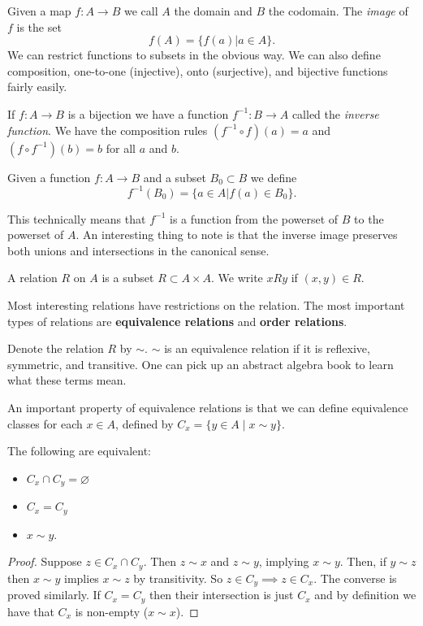Given a map $f: A \to B$ we call $A$ the domain and $B$ the codomain. The \textit{image} of $f$ is the set 
\[f(A) = \{f(a) | a \in A\}.\]
We can restrict functions to subsets in the obvious way. We can also define composition, one-to-one (injective), onto (surjective), and bijective functions fairly easily.

\begin{definition}
If $f:A \to B$ is a bijection we have a function $f^{-1}:B \to A$ called the \textit{inverse function}. We have the composition rules $(f^{-1} \circ f)(a) = a$ and $(f \circ f^{-1})(b) = b$ for all $a$ and $b$.
\end{definition}

\begin{definition}
Given a function $f: A \to B$ and a subset $B_0 \subset B$ we define 
\[f^{-1}(B_0) = \{a \in A | f(a) \in B_0\}.\]

This technically means that $f^{-1}$ is a function from the powerset of $B$ to the powerset of $A$. An interesting thing to note is that the inverse image preserves both unions and intersections in the canonical sense.
\end{definition}

\begin{definition}
A relation $R$ on $A$ is a subset $R \subset A \times A$. We write $xRy$ if $(x, y) \in R$. 
\end{definition}

Most interesting relations have restrictions on the relation. The most important types of relations are \textbf{equivalence relations} and \textbf{order relations}.

\begin{definition}
Denote the relation $R$ by $\sim$. $\sim$ is an equivalence relation if it is reflexive, symmetric, and transitive. One can pick up an abstract algebra book to learn what these terms mean.
\end{definition}

An important property of equivalence relations is that we can define equivalence classes for each $x \in A$, defined by $C_x = \{y \in A \mid x \sim y\}.$ 

\begin{proposition}
The following are equivalent:
\begin{itemize}
	\item $C_x \cap C_y = \varnothing$
	\item $C_x = C_y$
	\item $x \sim y$.
\end{itemize}
\end{proposition}
\begin{proof}
	Suppose $z \in C_x \cap C_y$. Then $z \sim x$ and $z \sim y$, implying $x \sim y$. Then, if $y \sim z$ then $x \sim y$ implies $x \sim z$ by transitivity. So $z \in C_y \implies z \in C_x$. The converse is proved similarly. If $C_x = C_y$ then their intersection is just $C_x$ and by definition we have that $C_x$ is non-empty ($x \sim x$).
\end{proof}

